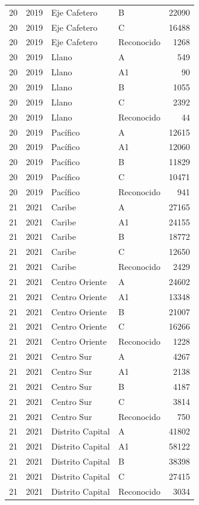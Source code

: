 \begin{longtable}{rrllr}
20 & 2019 & Eje Cafetero & B & 22090 \\
20 & 2019 & Eje Cafetero & C & 16488 \\
20 & 2019 & Eje Cafetero & Reconocido & 1268 \\
20 & 2019 & Llano & A & 549 \\
20 & 2019 & Llano & A1 & 90 \\
20 & 2019 & Llano & B & 1055 \\
20 & 2019 & Llano & C & 2392 \\
20 & 2019 & Llano & Reconocido & 44 \\
20 & 2019 & Pacífico & A & 12615 \\
20 & 2019 & Pacífico & A1 & 12060 \\
20 & 2019 & Pacífico & B & 11829 \\
20 & 2019 & Pacífico & C & 10471 \\
20 & 2019 & Pacífico & Reconocido & 941 \\
21 & 2021 & Caribe & A & 27165 \\
21 & 2021 & Caribe & A1 & 24155 \\
21 & 2021 & Caribe & B & 18772 \\
21 & 2021 & Caribe & C & 12650 \\
21 & 2021 & Caribe & Reconocido & 2429 \\
21 & 2021 & Centro Oriente & A & 24602 \\
21 & 2021 & Centro Oriente & A1 & 13348 \\
21 & 2021 & Centro Oriente & B & 21007 \\
21 & 2021 & Centro Oriente & C & 16266 \\
21 & 2021 & Centro Oriente & Reconocido & 1228 \\
21 & 2021 & Centro Sur & A & 4267 \\
21 & 2021 & Centro Sur & A1 & 2138 \\
21 & 2021 & Centro Sur & B & 4187 \\
21 & 2021 & Centro Sur & C & 3814 \\
21 & 2021 & Centro Sur & Reconocido & 750 \\
21 & 2021 & Distrito Capital & A & 41802 \\
21 & 2021 & Distrito Capital & A1 & 58122 \\
21 & 2021 & Distrito Capital & B & 38398 \\
21 & 2021 & Distrito Capital & C & 27415 \\
21 & 2021 & Distrito Capital & Reconocido & 3034 \\

\end{longtable}
